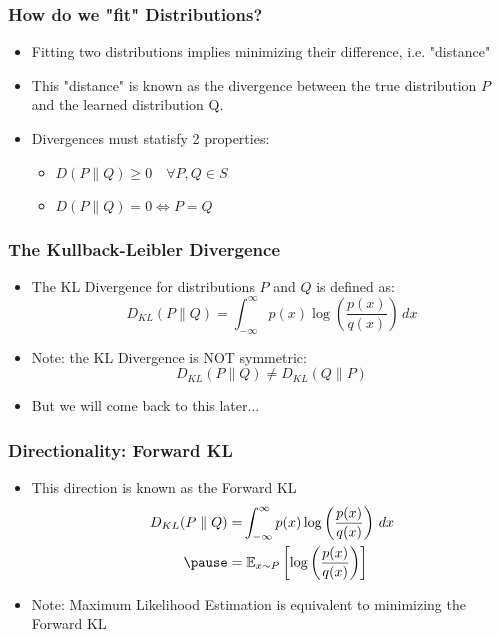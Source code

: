 \documentclass{beamer}
\begin{document}
\begin{frame}
  \frametitle{How do we "fit" Distributions?}
  \begin{itemize}
    \item Fitting two distributions implies minimizing their difference,
      i.e. "distance"
    \item This "distance" is known as the divergence between the true distribution
    $P$ and the learned distribution Q.
    \pause
    \item Divergences must statisfy 2 properties:
    \begin{itemize}
      \item $D(P \parallel Q ) \geq 0 \quad \forall P, Q \in S$
      \item $D(P \parallel Q ) = 0 \iff P = Q$
    \end{itemize}
  \end{itemize}

\end{frame}

\begin{frame}
  \frametitle{The Kullback-Leibler Divergence}
  \begin{itemize}
    \item The KL Divergence for distributions $P$ and $Q$ is defined as:
    \begin{equation*}
      D_{KL} (P \parallel Q) = \int_{-\infty}^{\infty} p(x)\log \left({\frac {p(x)}{q(x)}}\right)\,dx
    \end{equation*}
    \pause
    \item Note: the KL Divergence is NOT symmetric:
    \begin{equation*}
      D_{KL} (P \parallel Q) \not= D_{KL} (Q \parallel P)
    \end{equation*}
    \item But we will come back to this later...
  \end{itemize}
\end{frame}


\begin{frame}
  \frametitle{Directionality: Forward KL}
  \begin{itemize}
    \item This direction is known as the Forward KL
    \begin{equation*}
      \begin{aligned}
      D_{KL} (P \parallel Q) =& \int_{-\infty}^{\infty} p(x)\log \left({\frac {p(x)}{q(x)}}\right)\,dx \\
      \pause
      =& \; \mathbb{E}_{x \sim P} \left[ \log \left( \frac{p(x)}{q(x)} \right) \right]
      \end{aligned}
    \end{equation*}
    \pause
    \item Note: Maximum Likelihood Estimation is equivalent to minimizing the Forward KL
  \end{itemize}
\end{frame}
\end{document}
